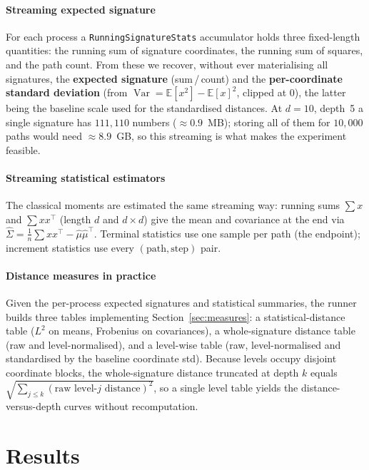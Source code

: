 \documentclass[11pt]{article}
\newcommand{\code}[1]{\texttt{#1}}
\newcommand{\E}{\mathbb{E}}
\newcommand{\Var}{\operatorname{Var}}
\begin{document}
\subsection{Streaming expected signature}
For each process a \code{RunningSignatureStats} accumulator holds three
fixed-length quantities: the running sum of signature coordinates, the running sum
of squares, and the path count. From these we recover, without ever materialising
all signatures, the \textbf{expected signature} (sum\,/\,count) and the
\textbf{per-coordinate standard deviation} (from
$\Var = \E[x^2]-\E[x]^2$, clipped at $0$), the latter being the baseline scale used
for the standardised distances. At $d=10$, depth~5 a single signature has
$111{,}110$ numbers ($\approx0.9$~MB); storing all of them for $10{,}000$ paths
would need $\approx8.9$~GB, so this streaming is what makes the experiment feasible.

\subsection{Streaming statistical estimators}
The classical moments are estimated the same streaming way: running sums
$\sum x$ and $\sum x x^{\top}$ (length $d$ and $d\times d$) give the mean and
covariance at the end via $\widehat\Sigma=\frac1n\sum xx^\top-\hat\mu\hat\mu^\top$.
Terminal statistics use one sample per path (the endpoint); increment statistics
use every $(\text{path},\text{step})$ pair.

\subsection{Distance measures in practice}
Given the per-process expected signatures and statistical summaries, the runner
builds three tables implementing Section~\ref{sec:measures}: a statistical-distance
table ($L^2$ on means, Frobenius on covariances), a whole-signature distance table
(raw and level-normalised), and a level-wise table (raw, level-normalised and
standardised by the baseline coordinate std). Because levels occupy disjoint
coordinate blocks, the whole-signature distance truncated at depth $k$ equals
$\sqrt{\sum_{j\le k}(\text{raw level-}j\text{ distance})^2}$, so a single level
table yields the distance-versus-depth curves without recomputation.

\part{Results}
\end{document}
